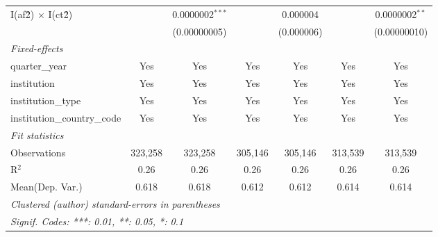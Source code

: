 \begin{tabular}{lcccccc}
   I(af\^2) $\times$ I(ct\^2)         &               & 0.0000002$^{***}$ &               & 0.000004        &               & 0.0000002$^{**}$\\   
                                      &               & (0.00000005)      &               & (0.000006)      &               & (0.00000010)\\   
   \midrule
   \emph{Fixed-effects}\\
   quarter\_year                      & Yes           & Yes               & Yes           & Yes             & Yes           & Yes\\  
   institution                        & Yes           & Yes               & Yes           & Yes             & Yes           & Yes\\  
   institution\_type                  & Yes           & Yes               & Yes           & Yes             & Yes           & Yes\\  
   institution\_country\_code         & Yes           & Yes               & Yes           & Yes             & Yes           & Yes\\  
   \midrule
   \emph{Fit statistics}\\
   Observations                       & 323,258       & 323,258           & 305,146       & 305,146         & 313,539       & 313,539\\  
   R$^2$                              & 0.26          & 0.26              & 0.26          & 0.26            & 0.26          & 0.26\\  
Mean(Dep. Var.) & 0.618 & 0.618 & 0.612 & 0.612 & 0.614 & 0.614 \\
   \midrule \midrule
   \multicolumn{7}{l}{\emph{Clustered (author) standard-errors in parentheses}}\\
   \multicolumn{7}{l}{\emph{Signif. Codes: ***: 0.01, **: 0.05, *: 0.1}}\\
\end{tabular}
\par\endgroup
